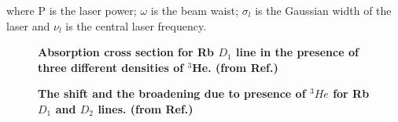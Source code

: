 where P is the laser power; $\omega$ is the beam waist;  $\sigma_{l}$ is the Gaussian width of the laser and $\nu_{l}$ is the central laser frequency.

\begin{figure}[t!]
	\centering
	\caption{{\bf Absorption cross section for Rb $D_{1}$ line in the presence of three different densities of $^{3}$He. (from Ref.\@ \cite{Romalis1997})}}
	\label{AbsorptionLine}
\end{figure}

\begin{figure}[t!]
	\centering
	\caption{{\bf The shift and the broadening due to presence of $^{3}He$ for Rb $D_{1}$ and $D_{2}$ lines. (from Ref.\@ \cite{Romalis1997})}}
	\label{AbsorptionLine}
\end{figure}

